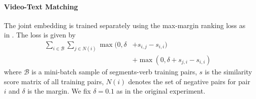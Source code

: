 \paragraph{Video-Text Matching} The joint embedding is trained separately using the max-margin ranking loss as in \cite{miech19howto100m}. The loss is given by
\begin{align*}
    \sum_{i\in\mathcal{B}}\sum_{j\in N(i)}\max(0,\delta&+s_{i,j}-s_{i,i})\\
    &+\max(0,\delta+s_{j,i}-s_{i,i})
\end{align*}
where $\mathcal{B}$ is a mini-batch sample of segments-verb training pairs, $s$ is the similarity score matrix of all training pairs, $N(i)$ denotes the set of negative pairs for pair $i$ and $\delta$ is the margin. We fix $\delta=0.1$ as in the original experiment.